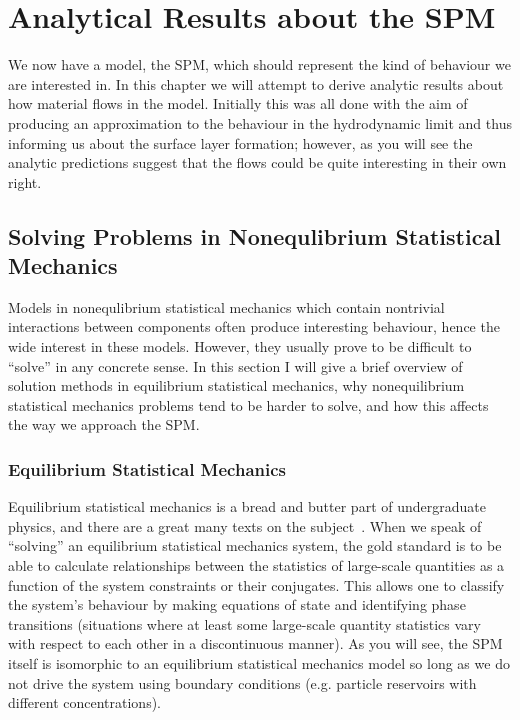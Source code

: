 \chapter{Analytical Results about the SPM}

We now have a model, the SPM, which should represent the kind of behaviour we are interested in. In this chapter we will attempt to derive analytic results about how material flows in the model. Initially this was all done with the aim of
producing an approximation to the behaviour in the hydrodynamic limit and thus informing us about the surface layer formation; however, as you will see the analytic predictions suggest that the flows could be quite interesting in their own
right.

\section{Solving Problems in Nonequlibrium Statistical Mechanics}
Models in nonequlibrium statistical mechanics which contain nontrivial interactions between components often produce interesting behaviour, hence the wide interest in these models. However, they usually prove to be difficult to ``solve'' in any
concrete sense. In this section I will give a brief overview of solution methods in equilibrium statistical mechanics, why nonequilibrium statistical mechanics problems tend to be harder to solve, and how this affects the way we approach
the SPM.


\subsection{Equilibrium Statistical Mechanics}

Equilibrium statistical mechanics is a bread and butter part of undergraduate physics, and there are a great many texts on the subject~\cite{landauLifshitzStatmech}. %
When we speak of ``solving'' an equilibrium statistical mechanics system, the gold standard is to be able to calculate relationships between the statistics of large-scale quantities as a function of the system constraints or their conjugates.
This allows one to classify the system's behaviour by making equations of state  and identifying phase transitions  (situations where at least some large-scale quantity statistics vary with respect to each other in a discontinuous manner).
As you will see, the SPM itself is isomorphic to an equilibrium statistical mechanics model so long as we do not drive the system using boundary conditions (e.g. particle reservoirs with different concentrations).
